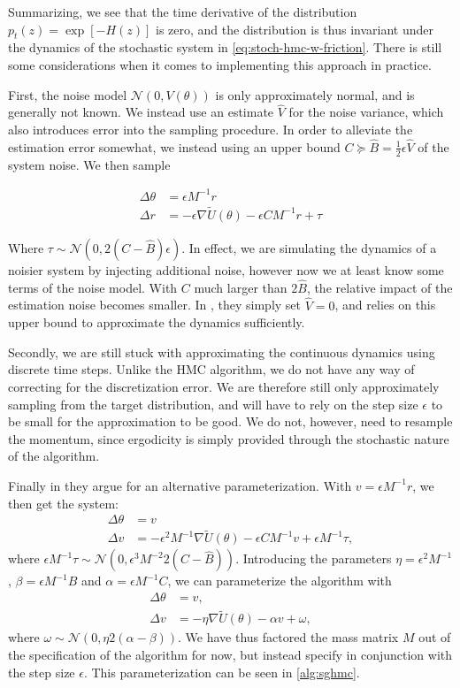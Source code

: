 Summarizing, we see that the time derivative of the distribution $p_t(z)=\exp[-H(z)]$ is zero, and the distribution is thus invariant under the dynamics of the stochastic system in \cref{eq:stoch-hmc-w-friction}. 
There is still some considerations when it comes to implementing this approach in practice. 

First, the noise model $\mathcal{N}(0, V(\theta))$ is only approximately normal, and is generally not known.
We instead use an estimate $\hat{V}$ for the noise variance, which also introduces error into the sampling procedure. 
In order to alleviate the estimation error somewhat, we instead using an upper bound $C \succeq \hat{B}= \frac{1}{2}\epsilon \hat{V}$ of the system noise.
We then sample

\begin{align}
    \Delta \theta &=  \epsilon M^{-1} r\\
    \Delta r &=  -\epsilon\nabla\tilde{U}(\theta) - \epsilon CM^{-1}r  + \tau
\end{align}

Where $\tau\sim  \mathcal{N}(0, 2(C - \hat{B})\epsilon)$.
In effect, we are simulating the dynamics of a noisier system by injecting additional noise, however now we at least know some terms of the noise model.
With $C$ much larger than $2\hat{B}$, the relative impact of the estimation noise becomes smaller. 
In \cite{chen_stochastic_2014}, they simply set $\hat{V} = 0$, and relies on this upper bound to approximate the dynamics sufficiently.  

Secondly, we are still stuck with approximating the continuous dynamics using discrete time steps.
Unlike the HMC algorithm, we do not have any way of correcting for the discretization error. 
We are therefore still only approximately sampling from the target distribution, and will have to rely on the step size $\epsilon$ to be small for the approximation to be good.
We do not, however, need to resample the momentum, since ergodicity is simply provided through the stochastic nature of the algorithm.

Finally in \cite{chen_stochastic_2014} they argue for an alternative parameterization.
With $v = \epsilon M^{-1} r$, we then get the system:
\begin{align}
    \Delta \theta &=  v \\
    \Delta v &=  -\epsilon^2 M^{-1} \nabla\tilde{U}(\theta) - \epsilon CM^{-1}v  + \epsilon M^{-1}\tau,
\end{align}
where $\epsilon M^{-1}\tau\sim \mathcal{N}(0, \epsilon^3M^{-2}2(C - \hat{B}))$.
Introducing the parameters $\eta = \epsilon^2M^{-1}$, $\beta = \epsilon M^{-1} B$ and $\alpha = \epsilon M^{-1}C$, we can parameterize the algorithm with
\begin{align}
    \Delta \theta &=  v, \\
    \Delta v &=  -\eta \nabla\tilde{U}(\theta) - \alpha v  + \omega,
\end{align}
where $\omega \sim \mathcal{N}(0, \eta 2(\alpha - \beta))$.
We have thus factored the mass matrix $M$ out of the specification of the algorithm for now, but instead specify in conjunction with the step size $\epsilon$. 
This parameterization can be seen in \cref{alg:sghmc}.

